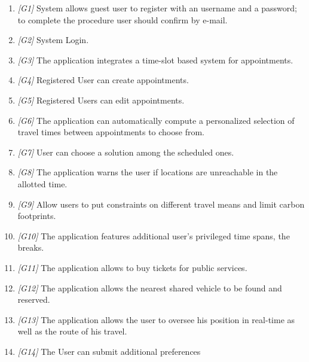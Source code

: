 \begin{enumerate}
	\item \textit{[G1]} 
		System allows guest user to register with an username and a password; to complete the procedure user should confirm by e-mail.
	\item \textit{[G2]} System Login.
	\item \textit{[G3]} The application integrates a time-slot based system for appointments.
	\item \textit{[G4]} Registered User can create appointments. 
	\item \textit{[G5]} Registered Users can edit appointments.
	\item \textit{[G6]} The application can automatically compute a personalized selection of travel times between appointments to choose from.
	\item \textit{[G7]} User can choose a solution among the scheduled ones.
	\item \textit{[G8]} The application warns the user if locations are unreachable in the allotted time.
	\item \textit{[G9]} Allow users to put constraints on different travel means and limit carbon footprints.
	\item \textit{[G10]} The application features additional user’s privileged time spans, the breaks.
	\item \textit{[G11]} The application allows to buy tickets for public services.
	\item \textit{[G12]} The application allows the nearest shared vehicle to be found and reserved.
	\item \textit{[G13]} The application allows the user to oversee his position in real-time as well as the route of his travel.
	\item \textit{[G14]} The User can submit additional preferences
		
\end{enumerate}	

